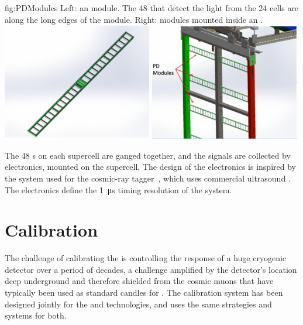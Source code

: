 \begin{dunefigure}{fig:PDModules}
{Left: an   module. The 48  that detect the light from the 24 cells are along the long edges of the module. Right:   modules mounted inside an .}
\includegraphics[width=0.49\textwidth]{graphics/PDBar.pdf}
\includegraphics[width=0.49\textwidth]{graphics/PDsInAPA.pdf}
\end{dunefigure}


The 48 s on each  supercell are ganged together, and the signals are collected by  electronics, mounted on the supercell. The design of the   electronics is inspired by the system used for the  cosmic-ray tagger~\cite{bib:mu2e_tdr}, which uses commercial ultrasound . The  electronics define the \SI{1}{\micro\second} timing resolution of the  system.

\section{Calibration}
\label{sec:exec-sp-calibration}

The challenge of calibrating the   is controlling the response of a huge cryogenic detector over a period of decades, a challenge amplified by the detector's location deep underground and therefore shielded from the cosmic muons that have typically been used as standard candles for %
.  The  calibration system  has been designed jointly for the  and  technologies, and uses the same strategies and systems for both.

